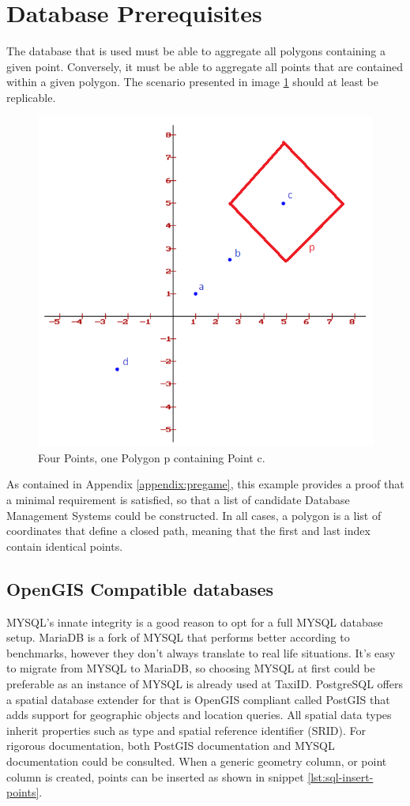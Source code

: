%
\section{Database Prerequisites}
The database that is used must be able to aggregate all polygons containing a given point. Conversely, it must be able to aggregate all points that are contained within a given polygon. The scenario presented in image \ref{fig:square} should at least be replicable.

\begin{figure}[htbp!]
	\centering
	\includegraphics[width=.5\textwidth]{Square}
	\caption[Square]{Four Points, one Polygon p containing Point c.}
	\label{fig:square}
\end{figure}

As contained in Appendix \ref{appendix:pregame}, this example provides a proof that a minimal requirement is satisfied, so that a list of candidate Database Management Systems could be constructed. In all cases, a polygon is a list of coordinates that define a closed path, meaning that the first and last index contain identical points.

\subsection{OpenGIS Compatible databases}
MYSQL’s innate integrity is a good reason to opt for a full MYSQL database setup. MariaDB is a fork of MYSQL that performs better according to benchmarks, however they don’t always translate to real life situations. It’s easy to migrate from MYSQL to MariaDB, so choosing MYSQL at first could be preferable as an instance of MYSQL is already used at TaxiID. PostgreSQL offers a spatial database extender for that is OpenGIS compliant called PostGIS that adds support for geographic objects and location queries. All spatial data types inherit properties such as type and spatial reference identifier (SRID). For rigorous documentation, both PostGIS documentation \cite{PostGIS} and MYSQL documentation \cite{MySQL} could be consulted. When a generic geometry column, or point column is created, points can be inserted as shown in snippet \ref{lst:sql-insert-points}.

